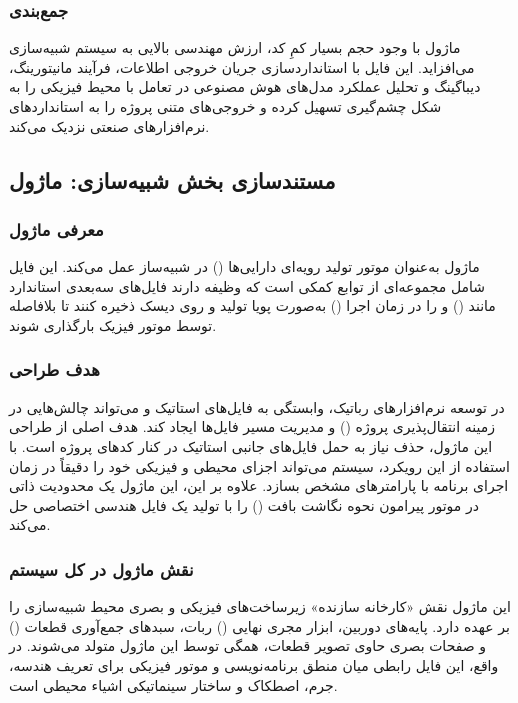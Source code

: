 \documentclass{article}
\begin{document}
\subsubsection{جمع‌بندی}
ماژول  با وجود حجم بسیار کمِ کد، ارزش مهندسی بالایی به سیستم شبیه‌سازی می‌افزاید. این فایل با استانداردسازی جریان خروجی اطلاعات، فرآیند مانیتورینگ، دیباگینگ و تحلیل عملکرد مدل‌های هوش مصنوعی در تعامل با محیط فیزیکی را به شکل چشم‌گیری تسهیل کرده و خروجی‌های متنی پروژه را به استانداردهای نرم‌افزارهای صنعتی نزدیک می‌کند.

\subsection{مستندسازی بخش شبیه‌سازی: ماژول }

\subsubsection{معرفی ماژول}
ماژول  به‌عنوان موتور تولید رویه‌ای دارایی‌ها () در شبیه‌ساز عمل می‌کند. این فایل شامل مجموعه‌ای از توابع کمکی است که وظیفه دارند فایل‌های سه‌بعدی استاندارد مانند  () و  را در زمان اجرا () به‌صورت پویا تولید و روی دیسک ذخیره کنند تا بلافاصله توسط موتور فیزیک  بارگذاری شوند.

\subsubsection{هدف طراحی}
در توسعه نرم‌افزارهای رباتیک، وابستگی به فایل‌های استاتیک  و  می‌تواند چالش‌هایی در زمینه انتقال‌پذیری پروژه () و مدیریت مسیر فایل‌ها ایجاد کند. هدف اصلی از طراحی این ماژول، حذف نیاز به حمل فایل‌های جانبی استاتیک در کنار کدهای پروژه است. با استفاده از این رویکرد، سیستم می‌تواند اجزای محیطی و فیزیکی خود را دقیقاً در زمان اجرای برنامه با پارامترهای مشخص بسازد. علاوه بر این، این ماژول یک محدودیت ذاتی در موتور  پیرامون نحوه نگاشت بافت () را با تولید یک فایل هندسی اختصاصی حل می‌کند.

\subsubsection{نقش ماژول در کل سیستم}
این ماژول نقش «کارخانه سازنده» زیرساخت‌های فیزیکی و بصری محیط شبیه‌سازی را بر عهده دارد. پایه‌های دوربین، ابزار مجری نهایی () ربات، سبدهای جمع‌آوری قطعات () و صفحات بصری حاوی تصویر قطعات، همگی توسط این ماژول متولد می‌شوند. در واقع، این فایل رابطی میان منطق برنامه‌نویسی و موتور فیزیکی برای تعریف هندسه، جرم، اصطکاک و ساختار سینماتیکی اشیاء محیطی است.
\end{document}

